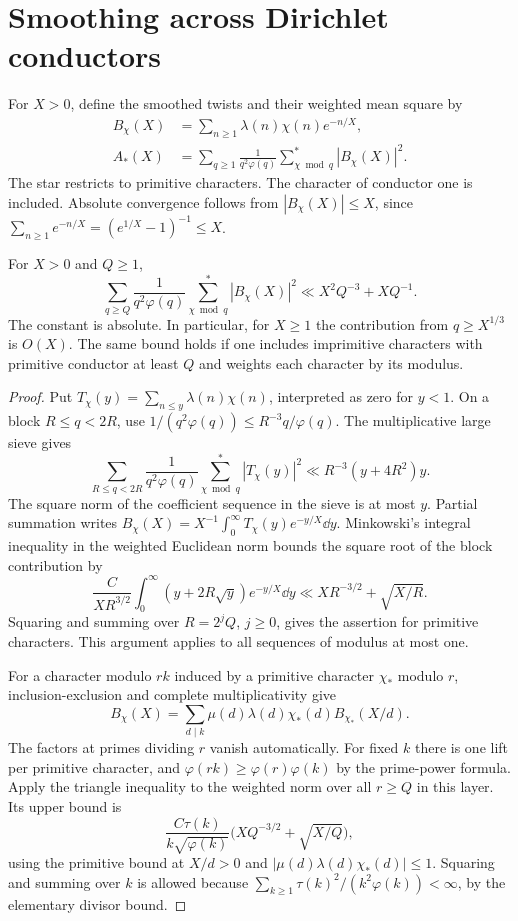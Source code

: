 \section{Smoothing across Dirichlet conductors}\label{sec:conductors}

For \(X>0\), define the smoothed twists and their weighted mean square by
\begin{align*}
 B_\chi(X)&=\sum_{n\ge1}\lambda(n)\chi(n)e^{-n/X},\\
 A_*(X)&=\sum_{q\ge1}\frac{1}{q^2\varphi(q)}
                 \sum_{\chi\bmod q}^{*}|B_\chi(X)|^2 .
\end{align*}
The star restricts to primitive characters. The character of conductor one is included. Absolute convergence follows from \(|B_\chi(X)|\le X\), since \(\sum_{n\ge1}e^{-n/X}=(e^{1/X}-1)^{-1}\le X\).

\begin{theorem}\label{thm:large-conductors}
For \(X>0\) and \(Q\ge1\),
\[
 \sum_{q\ge Q}\frac{1}{q^2\varphi(q)}
       \sum_{\chi\bmod q}^{*}|B_\chi(X)|^2
 \ll X^2Q^{-3}+XQ^{-1}.
\]
The constant is absolute. In particular, for \(X\ge1\) the contribution from \(q\ge X^{1/3}\) is \(O(X)\). The same bound holds if one includes imprimitive characters with primitive conductor at least \(Q\) and weights each character by its modulus.
\end{theorem}
\begin{proof}
Put \(T_\chi(y)=\sum_{n\le y}\lambda(n)\chi(n)\), interpreted as zero for \(y<1\). On a block \(R\le q<2R\), use \(1/(q^2\varphi(q))\le R^{-3}q/\varphi(q)\). The multiplicative large sieve \cite{mv-large} gives
\[
 \sum_{R\le q<2R}\frac{1}{q^2\varphi(q)}
             \sum_{\chi\bmod q}^{*}|T_\chi(y)|^2
 \ll R^{-3}(y+4R^2)y .
\]
The square norm of the coefficient sequence in the sieve is at most \(y\). Partial summation writes \(B_\chi(X)=X^{-1}\int_0^\infty T_\chi(y)e^{-y/X}\dd y\). Minkowski's integral inequality in the weighted Euclidean norm bounds the square root of the block contribution by
\[
 \frac{C}{XR^{3/2}}\int_0^\infty(y+2R\sqrt y)e^{-y/X}\dd y
 \ll XR^{-3/2}+\sqrt{X/R}.
\]
Squaring and summing over \(R=2^jQ\), \(j\ge0\), gives the assertion for primitive characters. This argument applies to all sequences of modulus at most one.

For a character modulo \(rk\) induced by a primitive character \(\chi_*\) modulo \(r\), inclusion-exclusion and complete multiplicativity give
\[
 B_\chi(X)=\sum_{d\mid k}\mu(d)\lambda(d)\chi_*(d)B_{\chi_*}(X/d).
\]
The factors at primes dividing \(r\) vanish automatically. For fixed \(k\) there is one lift per primitive character, and \(\varphi(rk)\ge\varphi(r)\varphi(k)\) by the prime-power formula. Apply the triangle inequality to the weighted norm over all \(r\ge Q\) in this layer. Its upper bound is
\[
 \frac{C\tau(k)}{k\sqrt{\varphi(k)}}
       \bigl(XQ^{-3/2}+\sqrt{X/Q}\bigr),
\]
using the primitive bound at \(X/d>0\) and \(|\mu(d)\lambda(d)\chi_*(d)|\le1\). Squaring and summing over \(k\) is allowed because \(\sum_{k\ge1}\tau(k)^2/(k^2\varphi(k))<\infty\), by the elementary divisor bound.
\end{proof}

